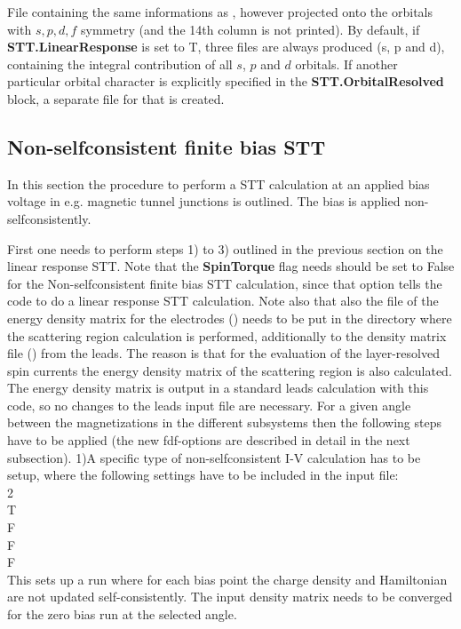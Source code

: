 \documentclass[11pt]{article}
\begin{document}
{
{File containing the same informations as , however projected onto the orbitals with $s,p,d,f$ symmetry (and the 14th column is not printed). By default, if {\bf STT.LinearResponse} is set to T, three files are always produced (s, p and d), containing the integral contribution of all $s$, $p$ and $d$ orbitals. If another particular orbital character is explicitly specified in the {\bf STT.OrbitalResolved} block, a separate file for that is created.}

\subsection{Non-selfconsistent finite bias STT}

In this section the procedure to perform a STT calculation at an applied bias voltage in e.g. magnetic tunnel junctions is outlined. The bias is applied non-selfconsistently.

First one needs to perform steps 1) to 3) outlined in the previous section on the linear response STT. Note that the {\bf SpinTorque} flag needs should be set to False for the Non-selfconsistent finite bias STT calculation, since that option tells the code to do a linear response STT calculation. Note also that also the file of the energy density matrix for the electrodes  () needs to be put in the directory where the scattering region calculation is performed, additionally to the density matrix file () from the leads. The reason is that for the evaluation of the layer-resolved spin currents the energy density matrix of the scattering region is also calculated. The energy density matrix is output in a standard leads calculation with this code, so no changes to the leads input file are necessary. For a given angle between the magnetizations in the different subsystems then the following steps have to be applied (the new fdf-options are described in detail in the next subsection).
1)A specific type of non-selfconsistent I-V calculation has to be setup, where the following settings have to be included in the input file:\\
 \hspace{1cm}{\bf MaxSCFIterations}\hspace{1cm} 2\\
 \hspace{1cm}{\bf EM.NonSelfconsistentRun}\hspace{1cm}T\\
 \hspace{1cm}{\bf MixHamiltonian}\hspace{1cm}F\\
 \hspace{1cm}{\bf ReadHamiltonian}\hspace{1cm}F\\
 \hspace{1cm}{\bf TimeReversal}\hspace{1cm}F\\
This sets up a run where for each bias point the charge density and Hamiltonian are not updated self-consistently. The input density matrix needs to be converged for the zero bias run at the selected angle.

}
\end{document}
